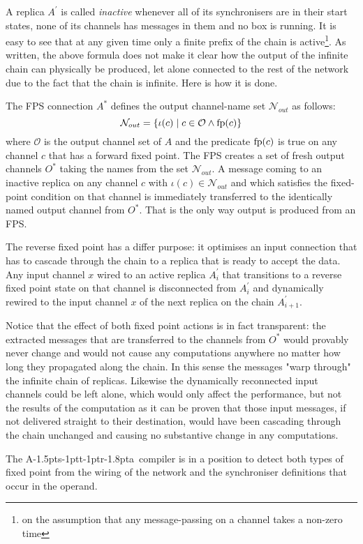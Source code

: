 \documentclass[11pt]{report}
\def\ak{{\textsf{A\kern-1.5pts\kern-1ptt\kern-1ptr\kern-1.8pta}}\kern-2pt{\it K\kern-2ptahn}}
\begin{document}
A replica $A^\prime$ is called {\em inactive} whenever all of its synchronisers are in their start states, none of its channels has messages in them and no box is running. It is easy to see that at any given time only a finite prefix of the chain is active\footnote{on the assumption that any message-passing on a channel takes a non-zero time}. As written, the above formula does not make it clear how the output of the infinite chain can physically be produced, let alone connected to the rest of the network due to the fact that the chain is infinite. Here is how it is done.

The FPS connection $A^*$ defines the output channel-name set $\mathcal N_{out}$ as follows:
\[
{\mathcal N_{out}} = \{\iota(c)\mid  c \in {\mathcal O} \wedge \hbox{fp}(c)\}
\]
where ${\mathcal O}$ is the output channel set of $A$ and the predicate $\hbox{fp}(c)$ is true on any channel $c$ that has a forward fixed point. The FPS creates a set of fresh output channels $O^*$ taking the names from the set $\mathcal N_{out}$.   A message coming to an inactive replica on any channel $c$ with $\iota(c) \in \mathcal N_{out}$ and which satisfies the fixed-point condition on that channel is  immediately transferred to the identically named output channel from $O^*$. That is the only way output is produced from an FPS.

The reverse fixed point has a differ purpose: it optimises an input connection that has to cascade through the chain to a replica that is ready to accept the data. Any input channel $x$ wired to an active replica $A^\prime_i$ that transitions to a reverse fixed point state on that channel is disconnected from  $A^\prime_i$ and dynamically rewired to the input channel $x$ of the next replica on the chain $A^\prime_{i+1}$.

Notice that the effect of both fixed point actions is in fact transparent: the extracted messages that are transferred to the channels from $O^*$ would provably never change and would not cause any computations anywhere no matter how long they propagated along the chain. In this sense the messages "warp through" the infinite chain of replicas. Likewise the dynamically reconnected input channels could be left alone, which would only affect the performance, but not the results of the computation as it can be proven that those input messages, if not delivered straight to their destination,  would have been cascading through the chain unchanged and causing no substantive change in any computations.

The \ak\ compiler is in a position to detect both types of fixed point from the wiring of the network and the synchroniser definitions that occur in the operand.
\end{document}
